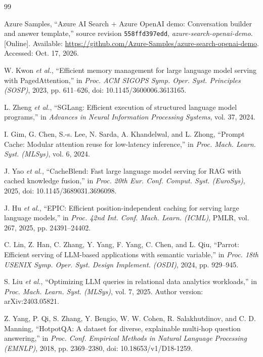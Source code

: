 \begin{thebibliography}{99}

Azure Samples, ``Azure AI Search + Azure OpenAI demo: Conversation builder and answer template,'' source revision \texttt{558ffd397edd}, \emph{azure-search-openai-demo}. [Online]. Available: \url{https://github.com/Azure-Samples/azure-search-openai-demo}. Accessed: Oct. 17, 2026.

W. Kwon \emph{et al.}, ``Efficient memory management for large language model serving with PagedAttention,'' in \emph{Proc. ACM SIGOPS Symp. Oper. Syst. Principles (SOSP)}, 2023, pp. 611--626, doi: 10.1145/3600006.3613165.

L. Zheng \emph{et al.}, ``SGLang: Efficient execution of structured language model programs,'' in \emph{Advances in Neural Information Processing Systems}, vol. 37, 2024.

I. Gim, G. Chen, S.-s. Lee, N. Sarda, A. Khandelwal, and L. Zhong, ``Prompt Cache: Modular attention reuse for low-latency inference,'' in \emph{Proc. Mach. Learn. Syst. (MLSys)}, vol. 6, 2024.

J. Yao \emph{et al.}, ``CacheBlend: Fast large language model serving for RAG with cached knowledge fusion,'' in \emph{Proc. 20th Eur. Conf. Comput. Syst. (EuroSys)}, 2025, doi: 10.1145/3689031.3696098.

J. Hu \emph{et al.}, ``EPIC: Efficient position-independent caching for serving large language models,'' in \emph{Proc. 42nd Int. Conf. Mach. Learn. (ICML)}, PMLR, vol. 267, 2025, pp. 24391--24402.

C. Lin, Z. Han, C. Zhang, Y. Yang, F. Yang, C. Chen, and L. Qiu, ``Parrot: Efficient serving of LLM-based applications with semantic variable,'' in \emph{Proc. 18th USENIX Symp. Oper. Syst. Design Implement. (OSDI)}, 2024, pp. 929--945.

S. Liu \emph{et al.}, ``Optimizing LLM queries in relational data analytics workloads,'' in \emph{Proc. Mach. Learn. Syst. (MLSys)}, vol. 7, 2025. Author version: arXiv:2403.05821.

Z. Yang, P. Qi, S. Zhang, Y. Bengio, W. W. Cohen, R. Salakhutdinov, and C. D. Manning, ``HotpotQA: A dataset for diverse, explainable multi-hop question answering,'' in \emph{Proc. Conf. Empirical Methods in Natural Language Processing (EMNLP)}, 2018, pp. 2369--2380, doi: 10.18653/v1/D18-1259.


\end{thebibliography}
